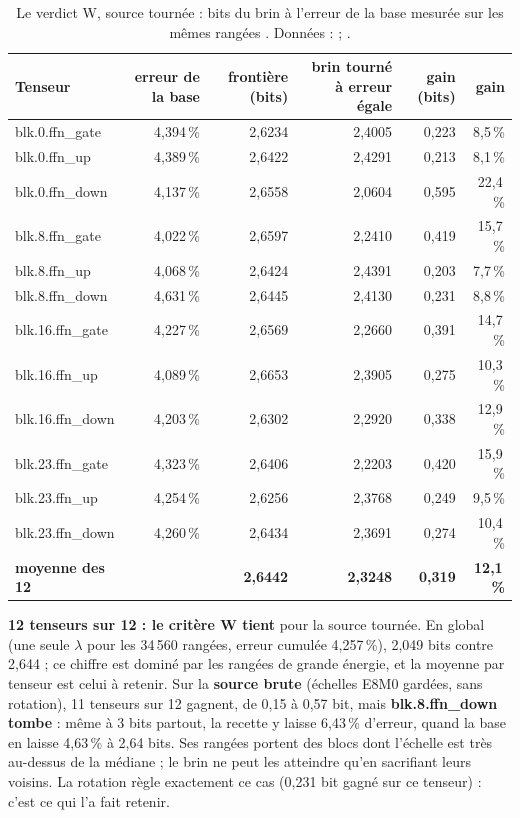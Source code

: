 \begin{table}[tbp]
\centering\small
\begin{tabular}{l r r r r r}
\toprule
Tenseur & erreur de la base & frontière (bits) & brin tourné à erreur égale & gain (bits) & gain \\
\midrule
blk.0.ffn\_gate & 4,394\,\% & 2,6234 & 2,4005 & 0,223 & 8,5\,\% \\
blk.0.ffn\_up & 4,389\,\% & 2,6422 & 2,4291 & 0,213 & 8,1\,\% \\
blk.0.ffn\_down & 4,137\,\% & 2,6558 & 2,0604 & 0,595 & 22,4\,\% \\
blk.8.ffn\_gate & 4,022\,\% & 2,6597 & 2,2410 & 0,419 & 15,7\,\% \\
blk.8.ffn\_up & 4,068\,\% & 2,6424 & 2,4391 & 0,203 & 7,7\,\% \\
blk.8.ffn\_down & 4,631\,\% & 2,6445 & 2,4130 & 0,231 & 8,8\,\% \\
blk.16.ffn\_gate & 4,227\,\% & 2,6569 & 2,2660 & 0,391 & 14,7\,\% \\
blk.16.ffn\_up & 4,089\,\% & 2,6653 & 2,3905 & 0,275 & 10,3\,\% \\
blk.16.ffn\_down & 4,203\,\% & 2,6302 & 2,2920 & 0,338 & 12,9\,\% \\
blk.23.ffn\_gate & 4,323\,\% & 2,6406 & 2,2203 & 0,420 & 15,9\,\% \\
blk.23.ffn\_up & 4,254\,\% & 2,6256 & 2,3768 & 0,249 & 9,5\,\% \\
blk.23.ffn\_down & 4,260\,\% & 2,6434 & 2,3691 & 0,274 & 10,4\,\% \\
\midrule
\textbf{moyenne des 12} & & \textbf{2,6442} & \textbf{2,3248} & \textbf{0,319} & \textbf{12,1\,\%} \\
\bottomrule
\end{tabular}
\caption[Le verdict W, tenseur par tenseur]{Le verdict W, source tournée : bits du brin à l'erreur de la base mesurée sur les mêmes rangées \mes. Données :  ; .}
\label{t3gen:tab:verdict}
\end{table}

\textbf{12 tenseurs sur 12 : le critère W tient} pour la source tournée. En global (une seule $\lambda$ pour les 34\,560 rangées, erreur cumulée 4,257\,\%), 2,049 bits contre 2,644 ; ce chiffre est dominé par les rangées de grande énergie, et la moyenne par tenseur est celui à retenir. Sur la \textbf{source brute} (échelles E8M0 gardées, sans rotation), 11 tenseurs sur 12 gagnent, de 0,15 à 0,57 bit, mais \textbf{blk.8.ffn\_down tombe} : même à 3 bits partout, la recette y laisse 6,43\,\% d'erreur, quand la base en laisse 4,63\,\% à 2,64 bits. Ses rangées portent des blocs dont l'échelle est très au-dessus de la médiane ; le brin ne peut les atteindre qu'en sacrifiant leurs voisins. La rotation règle exactement ce cas (0,231 bit gagné sur ce tenseur) : c'est ce qui l'a fait retenir.

